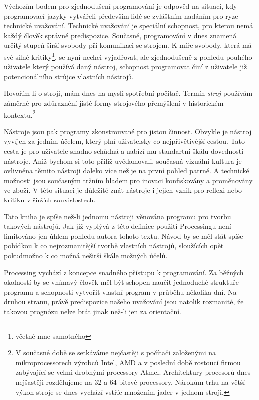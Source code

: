\documentclass[11pt]{article}
\begin{document}
Výchozím bodem pro zjednodušení programování je odpověd na situaci, kdy programovací jazyky vytvářeli především lidé se zvláštním nadáním pro ryze technické uvažování. Technické uvažování je speciální schopnost, pro kterou nemá každý člověk správné predispozice. Současně, programování v dnes znamená určitý stupeň širší svobody při komunikaci se strojem. K míře svobody, která má své silné kritiky\footnote{včetně mne samotného}, se nyní nechci vyjadřovat, ale zjednodušeně z pohledu pouhého uživatele který používá daný nástroj, schopnost programovat činí z uživatele již potencionálního strůjce vlastních nástrojů.

Hovořím-li o stroji, mám dnes na mysli spotřební počítač. Termín {\em stroj} používám záměrně pro zdůraznění jisté formy strojového přemýšlení v historickém kontextu.\footnote{V současné době se setkáváme nejčastěji s počítači založenými na mikroprocessorech výrobců Intel, AMD a v poslední době rostoucí firmou zabývající se velmi drobnými processory Atmel. Architektury procesorů dnes nejšastěji rozdělujeme na 32 a 64-bitové processory. Nárokům trhu na větší výkon stroje se dnes vychází vstříc množením jader v jednom stroji.}

Nástroje jsou pak programy zkonstrouvané pro jistou činnost. Obvykle je nástroj vyvíjen za jedním účelem, který plní uživatelsky co nejpřivětivější cestou. Tato cesta je pro uživatele snadno schůdná a nabízí mu standartní škálu dovedností nástroje. Aniž bychom si toto přiliž uvědomovali, současná vizuální kultura je ovlivněna těmito nástroji daleko více než je na první pohled patrné. A technické možnosti jsou současným tržním hladem pro inovaci konfiskovány a proměnovány ve zboží. V této situaci je důležité znát nástroje i jejich vznik pro reflexi nebo kritiku v širších souvislostech.

Tato kniha je spíše než-li jednomu nástroji věnována programu pro tvorbu takových nástrojů. Jak již vyplývá z této definice použití Processingu není limitováno jen úhlem pohledu autora tohoto textu. Návod by se měl stát spíše pobídkou k co nejrozmanitější tvorbě vlastních nástrojů, sloužících opět pokudmožno k co možná neširší škále možných účelů.

Processing vychází z koncepce snadného přístupu k programování. Za běžných okolností by se vnímavý člověk měl být schopen naučit jednoduché struktuře programu a schopnosti vytvořit vlastní program v průběhu několika dní. Na druhou stranu, právě predispozice našeho uvažování jsou natolik rozmanité, že takovou prognózu nelze brát jinak než-li jen za orientační.
\end{document}
